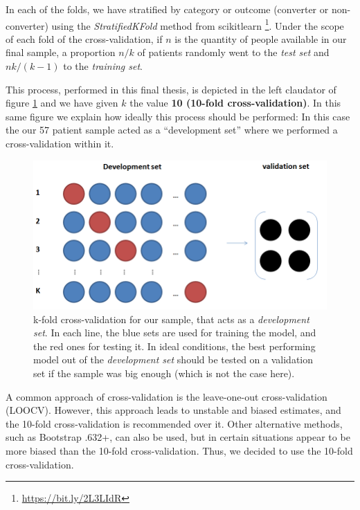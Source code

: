 \documentclass[a4paper,12pt]{elsarticle}  %
\begin{document}
In each of the folds, we have stratified by category or outcome \cite{Luo2016} (converter or non-converter) using the \textit{StratifiedKFold} method from scikitlearn \footnote{\href{https://bit.ly/2L3LIdR}{https://bit.ly/2L3LIdR}}. Under the scope of each fold of the cross-validation, if $n$ is the quantity of people available in our final sample, a proportion $n/k$ of patients randomly went to the \textit{test set} and $nk/(k-1)$ to the \textit{training set}.

This process, performed in this final thesis, is depicted in the left claudator of figure \ref{fig:cross_validation} and we have given $k$ the value \textbf{10 (10-fold cross-validation)}. In this same figure we explain how ideally this process should be performed: In this case the our 57 patient sample acted as a ``development set'' where we performed a cross-validation within it.

\begin{figure}[h] 
	\centering	
	\includegraphics[width=\textwidth]{fig_cross_validation.png}	
	\caption{k-fold cross-validation for our sample, that acts as a \textit{development set}. In each line, the blue sets are used for training the model, and the red ones for testing it. In ideal conditions, the best performing model out of the \textit{development set} should be tested on a validation set if the sample was big enough (which is not the case here).}
	\label{fig:cross_validation}
\end{figure}

\FloatBarrier

A common approach of cross-validation is the leave-one-out cross-validation (LOOCV). However, this approach leads to unstable and biased estimates\cite{Varoquaux2017166}, and the 10-fold cross-validation is recommended over it. Other alternative methods, such as Bootstrap .632+, can also be used, but in certain situations appear to be more biased than the 10-fold cross-validation\cite{Kim20093735}. Thus, we decided to use the 10-fold cross-validation.
\end{document}
